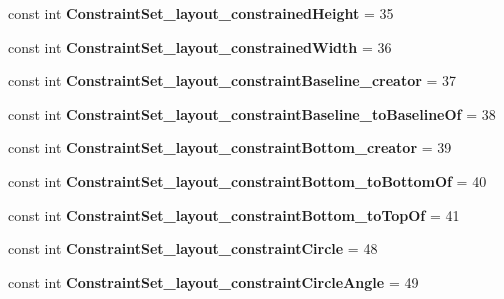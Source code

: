 \begin{DoxyCompactItemize}
const int {\bfseries Constraint\+Set\+\_\+layout\+\_\+constrained\+Height} = 35
\item 
\mbox{\label{classst_delivery_1_1_resource_1_1_styleable_a6a253954ceb19d253224014e3d32beb9}} 
const int {\bfseries Constraint\+Set\+\_\+layout\+\_\+constrained\+Width} = 36
\item 
\mbox{\label{classst_delivery_1_1_resource_1_1_styleable_afe7a756c445152644d76c8d65a99d4b2}} 
const int {\bfseries Constraint\+Set\+\_\+layout\+\_\+constraint\+Baseline\+\_\+creator} = 37
\item 
\mbox{\label{classst_delivery_1_1_resource_1_1_styleable_a1484923905f5601cd52819128e4f650b}} 
const int {\bfseries Constraint\+Set\+\_\+layout\+\_\+constraint\+Baseline\+\_\+to\+Baseline\+Of} = 38
\item 
\mbox{\label{classst_delivery_1_1_resource_1_1_styleable_a0ffa2b685be14797b785915ab5e43427}} 
const int {\bfseries Constraint\+Set\+\_\+layout\+\_\+constraint\+Bottom\+\_\+creator} = 39
\item 
\mbox{\label{classst_delivery_1_1_resource_1_1_styleable_a97e34dde858251b9b1b87bb3ecbf9cee}} 
const int {\bfseries Constraint\+Set\+\_\+layout\+\_\+constraint\+Bottom\+\_\+to\+Bottom\+Of} = 40
\item 
\mbox{\label{classst_delivery_1_1_resource_1_1_styleable_a4dac2710539a194245f61b7873b4e494}} 
const int {\bfseries Constraint\+Set\+\_\+layout\+\_\+constraint\+Bottom\+\_\+to\+Top\+Of} = 41
\item 
\mbox{\label{classst_delivery_1_1_resource_1_1_styleable_abfbd6387c6f785feb936b4273ff9a06b}} 
const int {\bfseries Constraint\+Set\+\_\+layout\+\_\+constraint\+Circle} = 48
\item 
\mbox{\label{classst_delivery_1_1_resource_1_1_styleable_ad5546d2be15330cddedcc48939c0bed1}} 
const int {\bfseries Constraint\+Set\+\_\+layout\+\_\+constraint\+Circle\+Angle} = 49

\end{DoxyCompactItemize}
